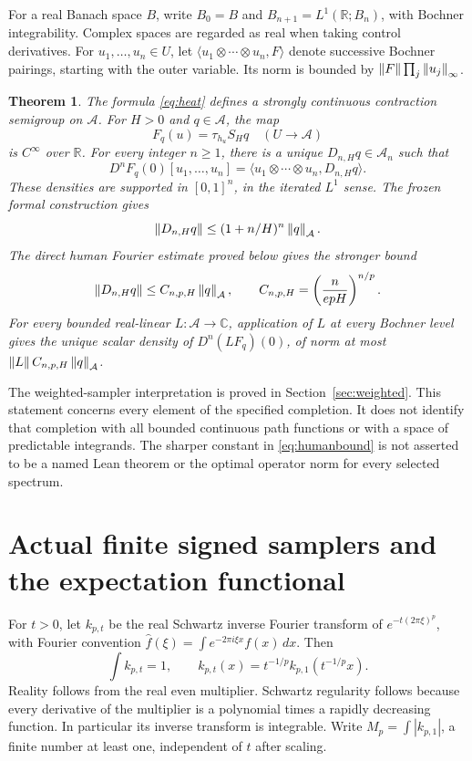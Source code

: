 \documentclass[11pt]{article}
\newtheorem{theorem}{Theorem}[section]
\theoremstyle{remark}\newtheorem{remark}[theorem]{Remark}
\newcommand{\R}{\mathbb R}\newcommand{\C}{\mathbb C}
\newcommand{\A}{\mathcal A}\newcommand{\X}{\mathcal X}
\begin{document}
For a real Banach space $B$, write $B_0=B$ and $B_{n+1}=L^1(\R;B_n)$, with Bochner integrability. Complex spaces are regarded as real when taking control derivatives. For $u_1,\ldots,u_n\in U$, let $\langle u_1\otimes\cdots\otimes u_n,F\rangle$ denote successive Bochner pairings, starting with the outer variable. Its norm is bounded by $\left\lVert F\right\rVert\prod_j\left\lVert u_j\right\rVert_\infty$.

\begin{theorem}\label{thm:main}
The formula \eqref{eq:heat} defines a strongly continuous contraction semigroup on $\A$. For $H>0$ and $q\in\A$, the map
\[
 F_q(u)=\tau_{h_u}S_Hq\quad(U\to\A)
\]
is $C^\infty$ over $\R$. For every integer $n\ge1$, there is a unique $D_{n,H}q\in\A_n$ such that
\begin{equation}\label{eq:density}
 D^nF_q(0)[u_1,\ldots,u_n]
 =\langle u_1\otimes\cdots\otimes u_n,D_{n,H}q\rangle.
\end{equation}
These densities are supported in $[0,1]^n$, in the iterated $L^1$ sense. The frozen formal construction gives
\begin{equation}\label{eq:formalbound}
 \norm{D_{n,H}q}\le(1+n/H)^n\norm q_{\A}.
\end{equation}
The direct human Fourier estimate proved below gives the stronger bound
\begin{equation}\label{eq:humanbound}
 \norm{D_{n,H}q}\le C_{n,p,H}\norm q_{\A},\qquad
 C_{n,p,H}=\left(\frac{n}{epH}\right)^{n/p}.
\end{equation}
For every bounded real-linear $L:\A\to\C$, application of $L$ at every Bochner level gives the unique scalar density of $D^n(LF_q)(0)$, of norm at most $\norm L C_{n,p,H}\norm q_{\A}$.
\end{theorem}

The weighted-sampler interpretation is proved in Section~\ref{sec:weighted}. This statement concerns every element of the specified completion. It does not identify that completion with all bounded continuous path functions or with a space of predictable integrands. The sharper constant in \eqref{eq:humanbound} is not asserted to be a named Lean theorem or the optimal operator norm for every selected spectrum.

\section{Actual finite signed samplers and the expectation functional}
For $t>0$, let $k_{p,t}$ be the real Schwartz inverse Fourier transform of $e^{-t(2\pi\xi)^p}$, with Fourier convention $\widehat f(\xi)=\int e^{-2\pi i\xi x}f(x)\,dx$. Then
\[
 \int k_{p,t}=1,\qquad
 k_{p,t}(x)=t^{-1/p}k_{p,1}(t^{-1/p}x).
\]
Reality follows from the real even multiplier. Schwartz regularity follows because every derivative of the multiplier is a polynomial times a rapidly decreasing function. In particular its inverse transform is integrable. Write $M_p=\int|k_{p,1}|$, a finite number at least one, independent of $t$ after scaling.
\end{document}
